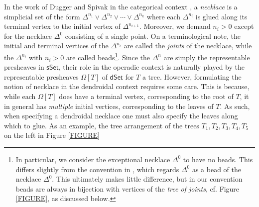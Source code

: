 \documentclass{hha}
\theoremstyle{definition} %
\begin{document}
In the work of Dugger and Spivak in the categorical context
\cite{DS11},
a \emph{necklace} is a simplicial set of the form
$\Delta^{n_1} \vee 
\Delta^{n_2} \vee \cdots \vee
\Delta^{n_k}$
where each $\Delta^{n_i}$ is glued along its terminal vertex to the initial vertex of $\Delta^{n_{i+1}}$.
Moreover, we demand $n_i > 0$
except for the necklace $\Delta^0$ consisting of a single point.
On a terminological note,
the initial and terminal vertices of the 
$\Delta^{n_i}$ are called the \emph{joints} of the necklace,
while the $\Delta^{n_i}$ with $n_i>0$ are called beads\footnote{In particular, 
we consider the exceptional necklace $\Delta^0$ to
have no beads.  
This differs slightly from the convention in \cite{DS11}, 
which regards $\Delta^0$ as a bead of the necklace $\Delta^0$. 
This ultimately makes little difference,
but in our convention beads are always in bijection with 
vertices of the \emph{tree of joints}, cf. Figure \ref{FIGURE},
as discussed below.}.
Since the $\Delta^n$ are simply the representable presheaves in 
$\mathsf{sSet}$,
their role in the operadic context is naturally played by the 
representable presheaves $\Omega[T]$ of $\mathsf{dSet}$
for $T$ a tree.
However, formulating the notion of necklace in the dendroidal context requires some care.
This is because, while each $\Omega[T]$ does have a terminal vertex, 
corresponding to the root of $T$, 
it in general has 
\emph{multiple} initial vertices, corresponding to the leaves
of $T$.
As such, when specifying a dendroidal necklace
one must also specify the leaves along which to glue.
As an example, the tree arrangement of the trees
$T_1,T_2,T_3,T_4,T_5$ on the left
in Figure \ref{FIGURE}
\end{document}
